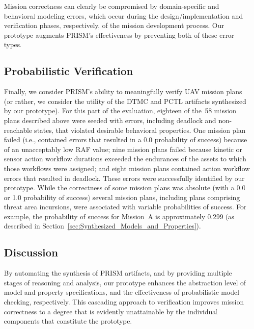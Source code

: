 Mission correctness can clearly be compromised by do\-main-specific and behavioral modeling errors, which occur during the design/implementation and verification phases, respectively, of the mission development process. Our prototype augments PRISM's effectiveness by preventing both of these error types.

\subsection{Probabilistic Verification}

\noindent Finally, we consider PRISM's ability to meaningfully verify UAV mission plans (or rather, we consider the utility of the DTMC and PCTL artifacts synthesized by our prototype). For this part of the evaluation, eighteen of the~58 mission plans described above were seeded with errors, including deadlock and non-reachable states, that violated desirable behavioral properties. One mission plan failed (i.e., contained errors that resulted in a 0.0 probability of success) because of an unacceptably low RAF value; nine mission plans failed because kinetic or sensor action workflow durations exceeded the endurances of the assets to which those workflows were assigned; and eight mission plans contained action workflow errors that resulted in deadlock. These errors were successfully identified by our prototype. While the correctness of some mission plans was absolute (with a 0.0 or 1.0 probability of success) several mission plans, including plans comprising threat area incursions, were associated with variable probabilities of success. For example, the probability of success for Mission~A is approximately 0.299 (as described in Section~\ref{sec:Synthesized_Models_and_Properties}).

\subsection{Discussion}

\noindent By automating the synthesis of PRISM artifacts, and by providing multiple stages of reasoning and analysis, our prototype enhances the abstraction level of model and property specifications, and the effectiveness of probabilistic model checking, respectively. This cascading approach to verification improves mission correctness to a degree that is evidently unattainable by the individual components that constitute the prototype.

